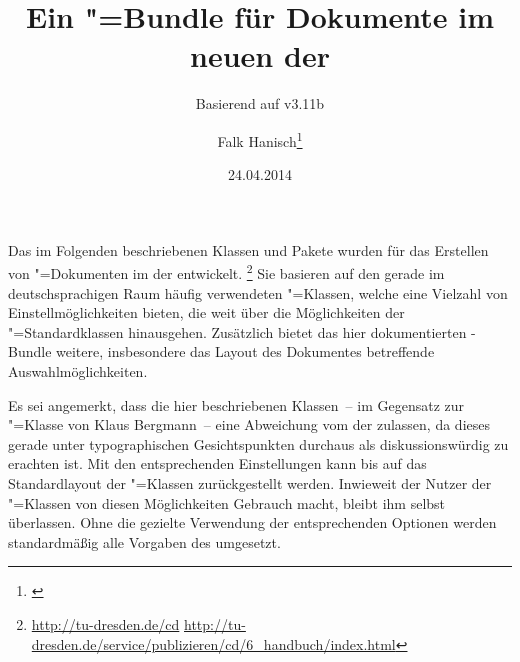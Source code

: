 \documentclass[%
  english,ngerman,%
  headings=optiontoheadandtoc,captions=tableheading,numbers=noenddot,%
  chapterpage,cdfoot,%
]{tudscrman}
\newcommand*\vKOMA{v3.11b}
\begin{document}
\pagestyle{headings}
\subject{\TUDScript{} \vTUDScript}
\title{%
  Ein "=Bundle für Dokumente\newline
  im neuen \CD der \TnUD%
}
\subtitle{Basierend auf \KOMAScript{} \vKOMA}
\author{Falk Hanisch\thanks{\noexpand\href{mailto:\filemail}{\filemail}}}
\date{24.04.2014}
\maketitle



\addchap{\prefacename}
Das im Folgenden beschriebenen Klassen und Pakete wurden für das Erstellen von 
"=Dokumenten im \CD der \TnUD entwickelt.%
\footnote{%
  \url{http://tu-dresden.de/cd}\quad
  \url{http://tu-dresden.de/service/publizieren/cd/6_handbuch/index.html}%
}
Sie basieren auf den gerade im deutschsprachigen Raum häufig verwendeten 
\KOMAScript"=Klassen, welche eine Vielzahl von Einstellmöglichkeiten bieten, die 
weit über die Möglichkeiten der "=Standardklassen hinausgehen. 
Zusätzlich bietet das hier dokumentierten \TUDScript-Bundle weitere, 
insbesondere das Layout des Dokumentes betreffende Auswahlmöglichkeiten.

Es sei angemerkt, dass die hier beschriebenen Klassen~-- im Gegensatz zur 
"=Klasse von Klaus Bergmann~-- eine Abweichung vom \CD der \TnUD 
zulassen, da dieses gerade unter typographischen Gesichtspunkten durchaus als 
diskussionswürdig zu erachten ist. Mit den entsprechenden Einstellungen kann 
bis auf das Standardlayout der \KOMAScript"=Klassen zurückgestellt werden. 
Inwieweit der Nutzer der \TUDScript"=Klassen von diesen Möglichkeiten Gebrauch 
macht, bleibt ihm selbst überlassen. Ohne die gezielte Verwendung der 
entsprechenden Optionen werden standardmäßig alle Vorgaben des \CDs umgesetzt.
\end{document}
